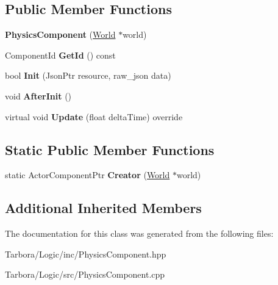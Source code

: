 \subsection*{Public Member Functions}
\begin{DoxyCompactItemize}
\item 
\mbox{\label{classTarbora_1_1PhysicsComponent_a3bf156d0a42bd132ea8ebb51b5c9e34c}} 
{\bfseries Physics\+Component} (\hyperlink{classTarbora_1_1World}{World} $\ast$world)
\item 
\mbox{\label{classTarbora_1_1PhysicsComponent_a6f091a08748045941ac8b7f64c7bf787}} 
Component\+Id {\bfseries Get\+Id} () const
\item 
\mbox{\label{classTarbora_1_1PhysicsComponent_aa3449fb88e5737316433a6c04565dcf3}} 
bool {\bfseries Init} (Json\+Ptr resource, raw\+\_\+json data)
\item 
\mbox{\label{classTarbora_1_1PhysicsComponent_ab6d6e87ef073850de24193ed144e9588}} 
void {\bfseries After\+Init} ()
\item 
\mbox{\label{classTarbora_1_1PhysicsComponent_a103b68beca09b42ccc6b01cff6e153bc}} 
virtual void {\bfseries Update} (float delta\+Time) override
\end{DoxyCompactItemize}
\subsection*{Static Public Member Functions}
\begin{DoxyCompactItemize}
\item 
\mbox{\label{classTarbora_1_1PhysicsComponent_ab94afd2c8e4d1b28356a44ae9ad963a5}} 
static Actor\+Component\+Ptr {\bfseries Creator} (\hyperlink{classTarbora_1_1World}{World} $\ast$world)
\end{DoxyCompactItemize}
\subsection*{Additional Inherited Members}


The documentation for this class was generated from the following files\+:\begin{DoxyCompactItemize}
\item 
Tarbora/\+Logic/inc/Physics\+Component.\+hpp\item 
Tarbora/\+Logic/src/Physics\+Component.\+cpp\end{DoxyCompactItemize}
